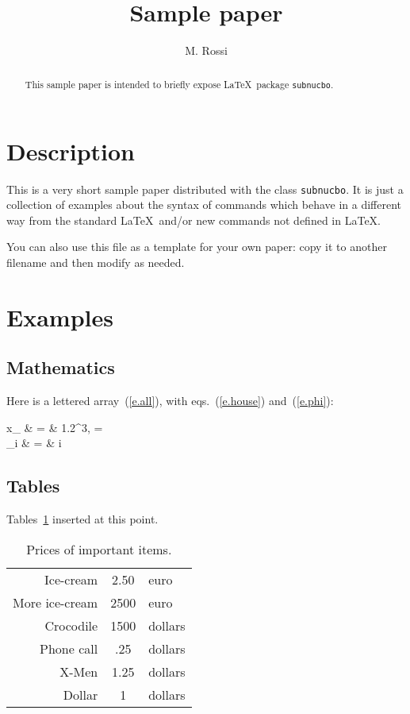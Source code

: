 \documentclass{subnucbo}
\title{Sample paper}
\author{M. Rossi}
\begin{document}
\maketitle

\begin{abstract}
This sample paper is intended to briefly expose \LaTeX\ package \texttt{subnucbo}.
\end{abstract}

\section{Description}
This is a very short sample paper distributed with the class
\texttt{subnucbo}.
It is just a collection of examples about the syntax of commands
which behave in a different way from the standard \LaTeX\
and/or new commands not defined in \LaTeX.


You can also use this file as a template for your own paper:
copy it to another filename and then modify as needed.

\section{Examples}


\subsection{Mathematics}
Here is a lettered array~(\ref{e.all}), with eqs.~(\ref{e.house})
and~(\ref{e.phi}):
\begin{eqnletter}
 \label{e.all}
 \drm x_ & = & 1.2^3, \qquad
                      \sy{F} =     \label{e.house}\\
 \phi_i        & = & i\pi                                \label{e.phi}
\end{eqnletter}

\subsection{Tables}
Tables~\ref{tab:pricesI}
inserted at this point.

\begin{table}
  \caption{Prices of important items.}
  \label{tab:pricesI}
  \begin{tabular}{rcl}
    \hline
      Ice-cream      & 2.50  & euro    \\
      More ice-cream & 2500 & euro    \\
      Crocodile      & 1500  & dollars \\
    \hline
      Phone call     & .25   & dollars \\
      X-Men          & 1.25  & dollars \\
      Dollar         & 1     & dollars \\
    \hline
  \end{tabular}
\end{table}
\end{document}
